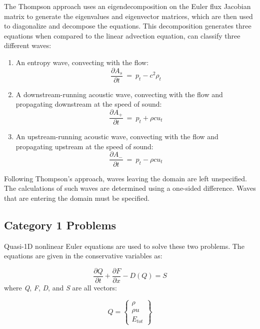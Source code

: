 \documentclass[conf]{new-aiaa}
\begin{document}
The Thompson approach \cite{Thompson1, Thompson2} uses an eigendecomposition on the Euler flux Jacobian matrix to generate the eigenvalues and eigenvector matrices, which are then used to diagonalize and decompose the equations. 
This decomposition generates three equations when compared to the linear advection equation, can classify three different waves:
\begin{enumerate}
	\item An entropy wave, convecting with the flow:
		\begin{equation*}
			\frac{\partial{A_s}}{\partial{t}}~=~p_t-c^2\rho_t
		\end{equation*}
	\item A downstream-running acoustic wave, convecting with the flow and propagating downstream at the speed of sound:
		\begin{equation*}
			\frac{\partial{A_+}}{\partial{t}}~=~p_t+\rho{c}u_t
		\end{equation*}
	\item An upstream-running acoustic wave, convecting with the flow and propagating upstream at the speed of sound:
		\begin{equation*}
			\frac{\partial{A_-}}{\partial{t}}~=~p_t-\rho{c}u_t
		\end{equation*}
\end{enumerate}
Following Thompson's approach, waves leaving the domain are left unspecified. 
The calculations of such waves are determined using a one-sided difference. 
Waves that are entering the domain must be specified.

 
 
\subsection{Category 1 Problems}
Quasi-1D nonlinear Euler equations are used to solve these two problems. The equations are given in the conservative variables as:

\begin{equation}
    \label{eq:Euler}
    \frac{\partial{Q}}{\partial{t}}+\frac{\partial{F}}{\partial{x}}-D(Q) = S
\end{equation}
where \textit{Q}, \textit{F}, \textit{D}, and \textit{S} are all vectors:

\begin{equation}
    \label{eq:Euler_Q}
    Q = 
    \begin{Bmatrix}
        \rho \\
        \rho{u} \\
        E_{tot}
  \end{Bmatrix}
\end{equation}
\end{document}

